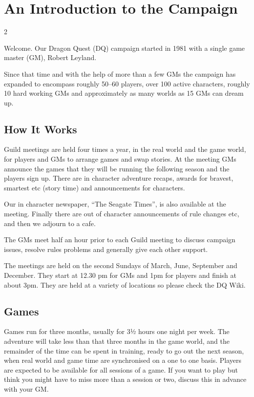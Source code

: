 \section{An Introduction to the Campaign}

\begin{multicols}{2}

Welcome. Our Dragon Quest (DQ) campaign started in 1981 with a single
game master (GM), Robert Leyland.

Since that time and with the help of more than a few GMs the campaign
has expanded to encompass roughly 50–60 players, over 100 active
characters, roughly 10 hard working GMs and approximately as many
worlds as 15 GMs can dream up.

\subsection{How It Works}

Guild meetings are held four times a year, in the real world and the
game world, for players and GMs to arrange games and swap stories.  At
the meeting GMs announce the games that they will be running the
following season and the players sign up. There are in character
adventure recaps, awards for bravest, smartest etc (story time) and
announcements for characters.

Our in character newspaper, “The Seagate Times”, is also available at
the meeting.  Finally there are out of character announcements of rule
changes etc, and then we adjourn to a cafe.

The GMs meet half an hour prior to each Guild meeting to discuss
campaign issues, resolve rules problems and generally give each other
support.

The meetings are held on the second Sundays of March, June, September
and December. They start at 12.30 pm for GMs and 1pm for players and
finish at about 3pm.  They are held at a variety of locations so
please check the DQ Wiki.

\subsection{Games}

Games run for three months, usually for 3½ hours one night per
week. The adventure will take less than that three months in the game
world, and the remainder of the time can be spent in training, ready
to go out the next season, when real world and game time are
synchronised on a one to one basis.  Players are expected to be
available for all sessions of a game. If you want to play but think
you might have to miss more than a session or two, discuss this in
advance with your GM.


\end{multicols}
